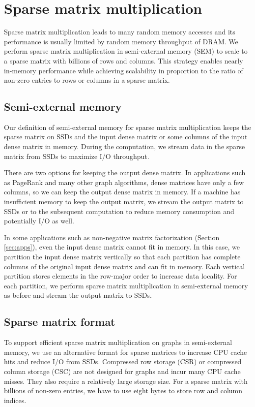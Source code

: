\section{Sparse matrix multiplication} \label{sec:spmm}
Sparse matrix multiplication leads to many random memory
accesses and its performance is usually limited by random memory throughput
of DRAM. We perform sparse matrix multiplication in semi-external memory (SEM)
to scale to a sparse matrix with billions of rows and columns. This strategy enables
nearly in-memory performance while achieving scalability in proportion
to the ratio of non-zero entries to rows or columns in a sparse matrix.

\subsection{Semi-external memory}
Our definition of semi-external memory for sparse matrix multiplication
keeps the sparse matrix on SSDs and the input dense matrix or some columns
of the input dense matrix in memory. During the computation, we stream
data in the sparse matrix from SSDs to maximize I/O throughput.

There are two options for keeping the output dense matrix. In applications
such as PageRank and many other graph
algorithms, dense matrices have only a few columns, so we can keep the output
dense matrix in memory. If a machine has insufficient
memory to keep the output matrix, we stream the output matrix
to SSDs or to the subsequent computation to reduce memory consumption and
potentially I/O as well.

In some applications such as non-negative matrix factorization (Section
\ref{sec:apps}), even the input dense matrix cannot fit in memory. In this case,
we partition the input dense matrix vertically so that each partition has
complete columns of the original input dense matrix and can fit in memory.
Each vertical partition stores elements in the row-major order to increase
data locality. For each partition, we perform sparse matrix multiplication
in semi-external memory as before and stream the output matrix to SSDs.

\subsection{Sparse matrix format}
To support efficient sparse matrix multiplication on graphs in semi-external
memory, we use an alternative format for sparse matrices to increase
CPU cache hits and reduce I/O from SSDs. Compressed row
storage (CSR) or compressed column storage (CSC) are not designed for
graphs and incur many CPU cache misses. They also require
a relatively large storage size. For a sparse matrix with billions of non-zero
entries, we have to use eight bytes to store row and column indices.


